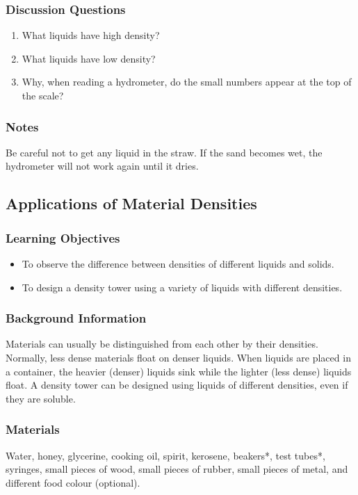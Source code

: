\subsubsection*{Discussion Questions}
\begin{enumerate}
\item{What liquids have high density?}
\item{What liquids have low density?}
\item{Why, when reading a hydrometer, do the small numbers appear at the top of the scale?}
\end{enumerate}

\subsubsection*{Notes}
Be careful not to get any liquid in the straw. If the sand becomes wet, the hydrometer will not work again until it dries.  

\subsection{Applications of Material Densities}

\subsubsection*{Learning Objectives}
\begin{itemize}
\item{To observe the difference between densities of different liquids and solids.} 
\item{To design a density tower using a variety of liquids with different densities.} 
\end{itemize}

\subsubsection*{Background Information}
Materials can usually be distinguished from each other by their densities.  Normally, less dense materials float on denser liquids.  When liquids are placed in a container, the heavier (denser) liquids sink while the lighter (less dense) liquids float.  A density tower can be designed using liquids of different densities, even if they are soluble.

\subsubsection*{Materials}
Water, honey, glycerine, cooking oil, spirit, kerosene, beakers*, test tubes*, syringes, small pieces of wood, small pieces of rubber, small pieces of metal, and different food colour (optional).

